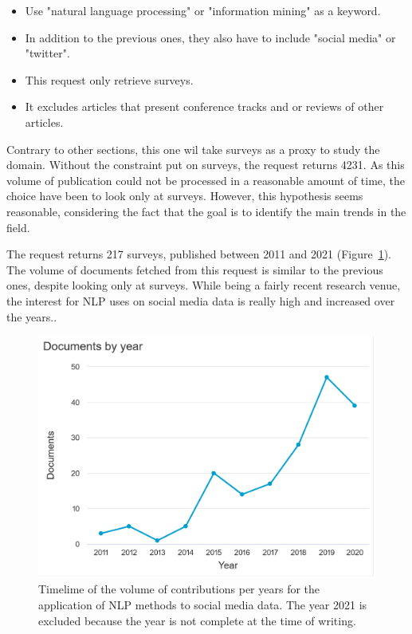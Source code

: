 \begin{itemize}
    \item Use "natural language processing" or "information mining" as a keyword.
    \item In addition to the previous ones, they also have to include "social media" or "twitter".
    \item This request only retrieve surveys.
    \item It excludes articles that present conference tracks and or reviews of other articles.
\end{itemize}

Contrary to other sections, this one wil take surveys as a proxy to study the domain.
Without the constraint put on surveys, the request returns 4231.
As this volume of publication could not be processed in a reasonable amount of time, the choice have been to look only at surveys.
However, this hypothesis seems reasonable, considering the fact that the goal is to identify the main trends in the field.

The request returns 217 surveys, published between 2011 and 2021 (Figure~\ref{literature:nlp-hist}).
The volume of documents fetched from this request is similar to the previous ones, despite looking only at surveys.
While being a fairly recent research venue, the interest for NLP uses on social media data is really high and increased over the years..

\begin{figure}[htb]
    \centering
    \includegraphics[width=\textwidth]{figures/chap-2/nlp-hist.pdf}
    \caption{Timelime of the volume of contributions per years for the application of NLP methods to social media data. The year 2021 is excluded because the year is not complete at the time of writing.}
    \label{literature:nlp-hist}
\end{figure}

